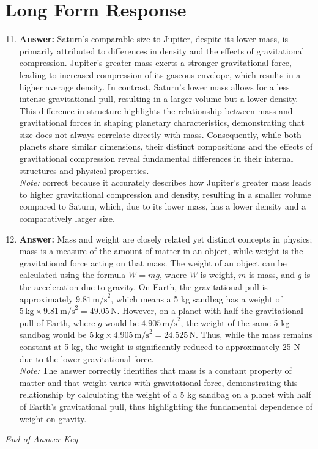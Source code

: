 \documentclass[12pt]{article}
\begin{document}
\section*{Long Form Response}
\begin{enumerate}[label=\arabic*.]
\setcounter{enumi}{10}
\item \textbf{Answer:} Saturn's comparable size to Jupiter, despite its lower mass, is primarily attributed to differences in density and the effects of gravitational compression. Jupiter's greater mass exerts a stronger gravitational force, leading to increased compression of its gaseous envelope, which results in a higher average density. In contrast, Saturn's lower mass allows for a less intense gravitational pull, resulting in a larger volume but a lower density. This difference in structure highlights the relationship between mass and gravitational forces in shaping planetary characteristics, demonstrating that size does not always correlate directly with mass. Consequently, while both planets share similar dimensions, their distinct compositions and the effects of gravitational compression reveal fundamental differences in their internal structures and physical properties.
\\ \textit{Note:} correct because it accurately describes how Jupiter's greater mass leads to higher gravitational compression and density, resulting in a smaller volume compared to Saturn, which, due to its lower mass, has a lower density and a comparatively larger size.
\item \textbf{Answer:} Mass and weight are closely related yet distinct concepts in physics; mass is a measure of the amount of matter in an object, while weight is the gravitational force acting on that mass. The weight of an object can be calculated using the formula \( W = mg \), where \( W \) is weight, \( m \) is mass, and \( g \) is the acceleration due to gravity. On Earth, the gravitational pull is approximately \( 9.81 \, \text{m/s}^2 \), which means a 5 kg sandbag has a weight of \( 5 \, \text{kg} \times 9.81 \, \text{m/s}^2 = 49.05 \, \text{N} \). However, on a planet with half the gravitational pull of Earth, where \( g \) would be \( 4.905 \, \text{m/s}^2 \), the weight of the same 5 kg sandbag would be \( 5 \, \text{kg} \times 4.905 \, \text{m/s}^2 = 24.525 \, \text{N} \). Thus, while the mass remains constant at 5 kg, the weight is significantly reduced to approximately 25 N due to the lower gravitational force.
\\ \textit{Note:} The answer correctly identifies that mass is a constant property of matter and that weight varies with gravitational force, demonstrating this relationship by calculating the weight of a 5 kg sandbag on a planet with half of Earth's gravitational pull, thus highlighting the fundamental dependence of weight on gravity.
\end{enumerate}

\vfill
\noindent\textit{End of Answer Key}
\end{document}

